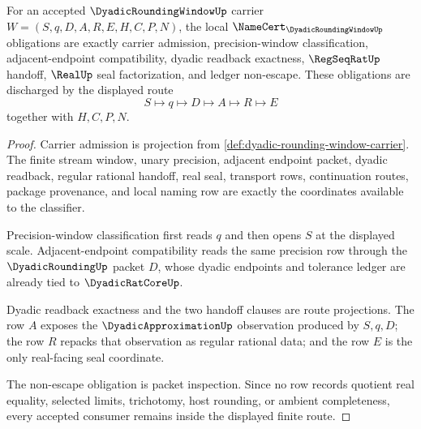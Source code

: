 \begin{theorem}
\label{thm:dyadicroundingwindow-namecert-obligations}
For an accepted $\DyadicRoundingWindowUp$ carrier $W=(S,q,D,A,R,E,H,C,P,N)$, the local $\NameCert_{\DyadicRoundingWindowUp}$ obligations are exactly carrier admission, precision-window classification, adjacent-endpoint compatibility, dyadic readback exactness, $\RegSeqRatUp$ handoff, $\RealUp$ seal factorization, and ledger non-escape. These obligations are discharged by the displayed route
$$
S\longmapsto q\longmapsto D\longmapsto A\longmapsto R\longmapsto E
$$
together with $H,C,P,N$.
\end{theorem}
\begin{proof}
Carrier admission is projection from \autoref{def:dyadic-rounding-window-carrier}. The finite stream window, unary precision, adjacent endpoint packet, dyadic readback, regular rational handoff, real seal, transport rows, continuation routes, package provenance, and local naming row are exactly the coordinates available to the classifier.

Precision-window classification first reads $q$ and then opens $S$ at the displayed scale. Adjacent-endpoint compatibility reads the same precision row through the $\DyadicRoundingUp$ packet $D$, whose dyadic endpoints and tolerance ledger are already tied to $\DyadicRatCoreUp$.

Dyadic readback exactness and the two handoff clauses are route projections. The row $A$ exposes the $\DyadicApproximationUp$ observation produced by $S,q,D$; the row $R$ repacks that observation as regular rational data; and the row $E$ is the only real-facing seal coordinate.

The non-escape obligation is packet inspection. Since no row records quotient real equality, selected limits, trichotomy, host rounding, or ambient completeness, every accepted consumer remains inside the displayed finite route.
\end{proof}

